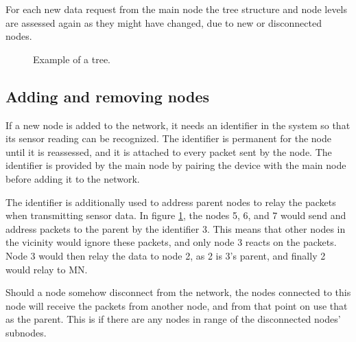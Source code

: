 For each new data request from the main node the tree structure and node levels are assessed again as they might have changed, due to new or disconnected nodes.

\begin{figure}[!h]
	\centering
	\caption{Example of a tree.}
	\label{fig:prottree1}
\end{figure}

\subsection*{Adding and removing nodes}
If a new node is added to the network, it needs an identifier in the system so that its sensor reading can be recognized. The identifier is permanent for the node until it is reassessed, and it is attached to every packet sent by the node.
The identifier is provided by the main node by pairing the device with the main node before adding it to the network. 

The identifier is additionally used to address parent nodes to relay the packets when transmitting sensor data. In figure \ref{fig:prottree1}, the nodes 5, 6, and 7 would send and address packets to the parent by the identifier 3. This means that other nodes in the vicinity would ignore these packets, and only node 3 reacts on the packets. Node 3 would then relay the data to node 2, as 2 is 3's parent, and finally 2 would relay to MN.

Should a node somehow disconnect from the network, the nodes connected to this node will receive the packets from another node, and from that point on use that as the parent. This is if there are any nodes in range of the disconnected nodes' subnodes. 

